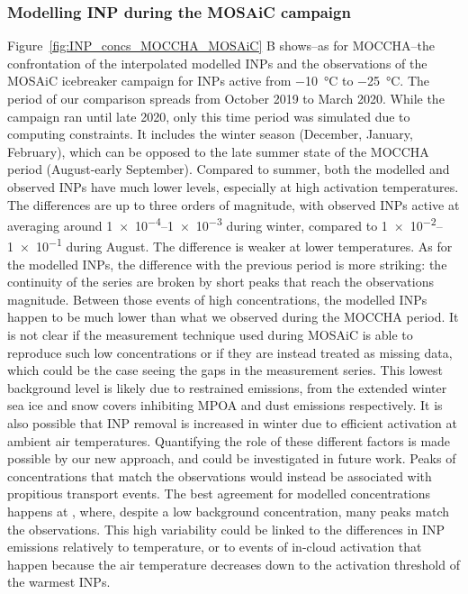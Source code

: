 
        \subsubsection{Modelling INP during the MOSAiC campaign}
        \label{sec:INP_modelling_MOSAiC}
        Figure~\ref{fig:INP_concs_MOCCHA_MOSAiC} B shows\---as for MOCCHA\---the confrontation of the interpolated modelled INPs and the observations of the MOSAiC icebreaker campaign for INPs active from \SI{-10}{\degreeCelsius} to \SI{-25}{\degreeCelsius}.
        The period of our comparison spreads from October 2019 to March 2020. While the campaign ran until late 2020, only this time period was simulated due to computing constraints. It includes the winter season (December, January, February), which can be opposed to the late summer state of the MOCCHA period (August\--early September).
        Compared to summer, both the modelled and observed INPs have much lower levels, especially at high activation temperatures.
        The differences are up to three orders of magnitude, with observed INPs active at  averaging around \numrange{1e-4}{1e-3} during winter, compared to \numrange{1e-2}{1e-1} during August.
        The difference is weaker at lower temperatures.
        As for the modelled INPs, the difference with the previous period is more striking: the continuity of the series are broken by short peaks that reach the observations magnitude. Between those events of high concentrations, the modelled INPs happen to be much lower than what we observed during the MOCCHA period. It is not clear if  the measurement technique used during MOSAiC is able to reproduce such low concentrations or if they are instead treated as missing data, which could be the case seeing the gaps in the measurement series.
        This lowest background level is likely due to restrained emissions, from the extended winter sea ice and snow covers inhibiting MPOA and dust emissions respectively. It is also possible that INP removal is increased in winter due to efficient activation at ambient air temperatures. Quantifying the role of these different factors is made possible by our new approach, and could be investigated in future work.
        Peaks of concentrations that match the observations would instead be associated with propitious transport events.
        The best agreement for modelled concentrations happens at , where, despite a low background concentration, many peaks match the observations.
        This high variability could be linked to the differences in INP emissions relatively to temperature, or to events of in-cloud activation that happen because the air temperature decreases down to the activation threshold of the warmest INPs.

